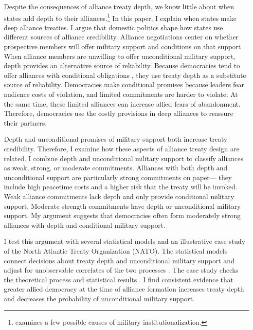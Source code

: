 \documentclass[12pt]{article}
\begin{document}
Despite the consequences of alliance treaty depth, we know little about when states add depth to their alliances.\footnote{\citet{Mattes2012} examines a few possible causes of military institutionalization.}
In this paper, I explain when states make deep alliance treaties.
I argue that domestic politics shape how states use different sources of alliance credibility. 
Alliance negotiations center on whether prospective members will offer military support and conditions on that support \citep{Poast2019a}. 
When alliance members are unwilling to offer unconditional military support, depth provides an alternative source of reliability.%
Because democracies tend to offer alliances with conditional obligations \citep{Mattes2012, Chibaetal2015}, they use treaty depth as a substitute source of reliability. 
Democracies make conditional promises because leaders fear audience costs of violation, and limited commitments are harder to violate.
At the same time, these limited alliances can increase allied fears of abandonment. 
Therefore, democracies use the costly provisions in deep alliances to reassure their partners.   


Depth and unconditional promises of military support both increase treaty credibility. 
Therefore, I examine how these aspects of alliance treaty design are related. 
I combine depth and unconditional military support to classify alliances as weak, strong, or moderate commitments. 
Alliances with both depth and unconditional support are particularly strong commitments on paper--- they include high peacetime costs and a higher risk that the treaty will be invoked. 
Weak alliance commitments lack depth and only provide conditional military support. 
Moderate strength commitments have depth or unconditional military support. 
My argument suggests that democracies often form moderately strong alliances with depth and conditional military support.  


I test this argument with several statistical models and an illustrative case study of the North Atlantic Treaty Organization (NATO).
The statistical models connect decisions about treaty depth and unconditional military support and adjust for unobservable correlates of the two processes \citep{Braumoelleretal2018}. 
The case study checks the theoretical process and statistical results \citep{SeawrightGerring2008, Seawright2016}. 
I find consistent evidence that greater allied democracy at the time of alliance formation increases treaty depth and decreases the probability of unconditional military support. 
\end{document}
